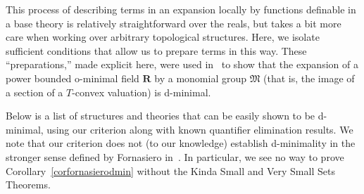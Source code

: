 \documentclass[11pt]{amsart}
\theoremstyle{plain}
\theoremstyle{definition}
\numberwithin{equation}{section}
\newcommand\0{\varnothing}
\begin{document}
\medskip\noindent
This process of describing terms in an expansion locally by functions definable in a base theory is relatively straightforward over the reals, but takes a bit more care when working over arbitrary topological structures. Here, we isolate sufficient conditions that allow us
to prepare terms in this way. These ``preparations,'' made explicit here, were used in~\cite{kaplan2023dichotomy} to show that the expansion of a power bounded o-minimal field $\bm{R}$ by a monomial group $\mathfrak{M}$ (that is, the image of a section of a $T$-convex valuation) is d-minimal.

\medskip\noindent
Below is a list of structures and theories that can be easily shown to be d-minimal, using our criterion along with known quantifier elimination results. We note that our criterion does not (to our knowledge) establish d-minimality in the stronger sense defined by Fornasiero in~\cite[Definition 9.1]{fornasiero-dimmatroiddense}. In particular, we see no way to prove Corollary~\ref{corfornasierodmin} without the Kinda Small and Very Small Sets Theorems.
\end{document}
